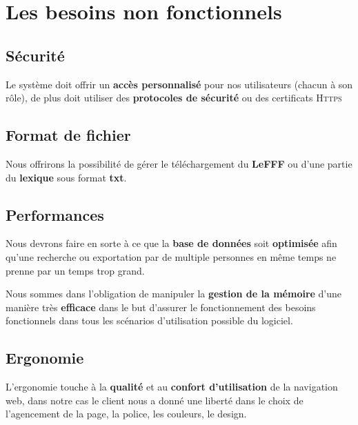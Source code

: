 \section{Les besoins non fonctionnels}

\subsection{Sécurité}
{Le système doit offrir un \textbf{accès personnalisé} pour nos utilisateurs (chacun à son rôle), de plus doit utiliser des \textbf{protocoles de sécurité} ou des certificats \textsc{Https} }

\subsection{Format de fichier}
Nous offrirons la possibilité de gérer le téléchargement du \textbf{LeFFF} ou d'une partie du \textbf{lexique} sous format \textbf{txt}.

\subsection{Performances}

{Nous devrons faire en sorte à ce que la \textbf{base de données} soit \textbf{optimisée} afin qu'une recherche ou exportation par de multiple personnes en même temps ne prenne par un temps trop grand.\par}
Nous sommes dans l'obligation de manipuler la \textbf{gestion de la mémoire} d'une manière très \textbf{efficace} dans le but d'assurer le fonctionnement des besoins fonctionnels dans tous les scénarios d'utilisation possible du logiciel. 

\subsection{Ergonomie}
L’ergonomie touche à la \textbf{qualité} et au \textbf{confort d’utilisation} de la navigation web, dans notre cas le client nous a donné une liberté dans le choix de l'agencement de la page, la police, les couleurs, le design. 
